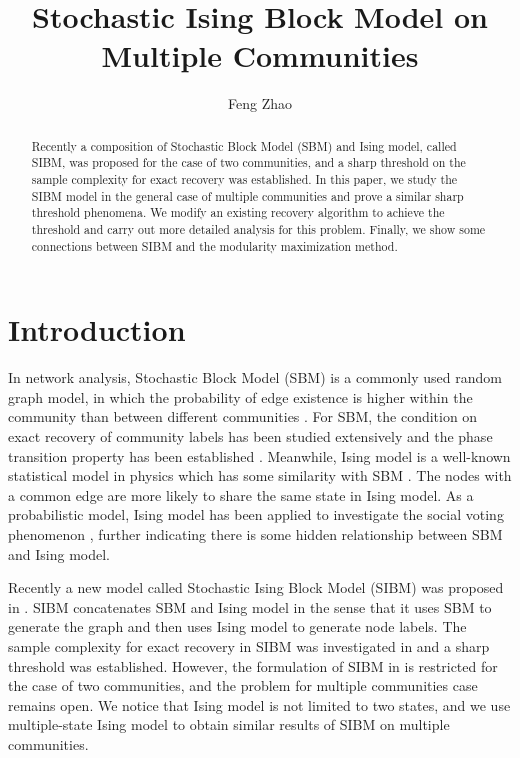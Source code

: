 \documentclass{article}
\title{Stochastic Ising Block Model on Multiple Communities}
\author{Feng Zhao}
\begin{document}
	\maketitle
\begin{abstract}
	Recently a composition of Stochastic Block Model (SBM) and Ising model, called SIBM, was proposed for the case
	of two communities, and a sharp threshold on the sample complexity for exact recovery was established.
	In this paper, we study the SIBM model in the general case of multiple communities and prove a similar sharp
	threshold phenomena. We modify an existing recovery algorithm to achieve the threshold
	and carry out more detailed analysis for this problem. Finally, we show some connections between SIBM and the modularity maximization method.
\end{abstract}

\section{Introduction}
	In network analysis, Stochastic Block Model (SBM) is a commonly used random graph model, in which the probability of edge existence is higher within the community than between different communities \cite{holland1983stochastic, Abbe17}. For SBM, the condition on exact recovery of community labels has been studied extensively and the phase transition property has been established \cite{abbe2015community, mossel2016}. Meanwhile, Ising model is a well-known statistical model in physics which has some similarity with SBM \cite{ising1925beitrag}. The nodes with a common edge are more likely to share the same state in Ising model\label{key}.
As a probabilistic model, Ising model has been applied to investigate the social voting phenomenon \cite{banerjee2008model}, further indicating there is some hidden relationship between SBM and Ising model.

Recently a new model called Stochastic Ising Block Model (SIBM) was proposed in \cite{ye2020exact}. SIBM concatenates SBM and Ising model in the sense that it uses SBM to generate the graph and then uses Ising model to generate node labels. The sample complexity for exact recovery in SIBM was investigated in \cite{ye2020exact} and a sharp threshold was established. However, the formulation of SIBM in \cite{ye2020exact} is restricted for the case of two communities, and the problem for multiple communities case remains open.
We notice that Ising model is not limited to two states, 
and we use multiple-state Ising model \cite{potts1952some} to obtain similar results of SIBM on multiple communities.
\end{document}
